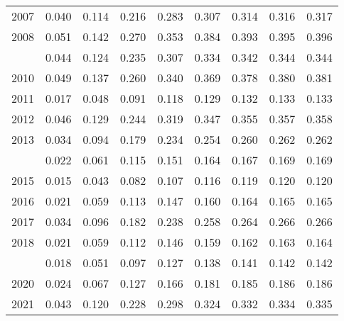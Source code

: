\documentclass[
]{article}
\begin{document}
\begin{longtable}[t]{lrrrrrrrr}
2007 & 0.040 & 0.114 & 0.216 & 0.283 & 0.307 & 0.314 & 0.316 & 0.317\\
2008 & 0.051 & 0.142 & 0.270 & 0.353 & 0.384 & 0.393 & 0.395 & 0.396\\
\addlinespace
2009 & 0.044 & 0.124 & 0.235 & 0.307 & 0.334 & 0.342 & 0.344 & 0.344\\
2010 & 0.049 & 0.137 & 0.260 & 0.340 & 0.369 & 0.378 & 0.380 & 0.381\\
2011 & 0.017 & 0.048 & 0.091 & 0.118 & 0.129 & 0.132 & 0.133 & 0.133\\
2012 & 0.046 & 0.129 & 0.244 & 0.319 & 0.347 & 0.355 & 0.357 & 0.358\\
2013 & 0.034 & 0.094 & 0.179 & 0.234 & 0.254 & 0.260 & 0.262 & 0.262\\
\addlinespace
2014 & 0.022 & 0.061 & 0.115 & 0.151 & 0.164 & 0.167 & 0.169 & 0.169\\
2015 & 0.015 & 0.043 & 0.082 & 0.107 & 0.116 & 0.119 & 0.120 & 0.120\\
2016 & 0.021 & 0.059 & 0.113 & 0.147 & 0.160 & 0.164 & 0.165 & 0.165\\
2017 & 0.034 & 0.096 & 0.182 & 0.238 & 0.258 & 0.264 & 0.266 & 0.266\\
2018 & 0.021 & 0.059 & 0.112 & 0.146 & 0.159 & 0.162 & 0.163 & 0.164\\
\addlinespace
2019 & 0.018 & 0.051 & 0.097 & 0.127 & 0.138 & 0.141 & 0.142 & 0.142\\
2020 & 0.024 & 0.067 & 0.127 & 0.166 & 0.181 & 0.185 & 0.186 & 0.186\\
2021 & 0.043 & 0.120 & 0.228 & 0.298 & 0.324 & 0.332 & 0.334 & 0.335\\*
\end{longtable}
\end{document}
